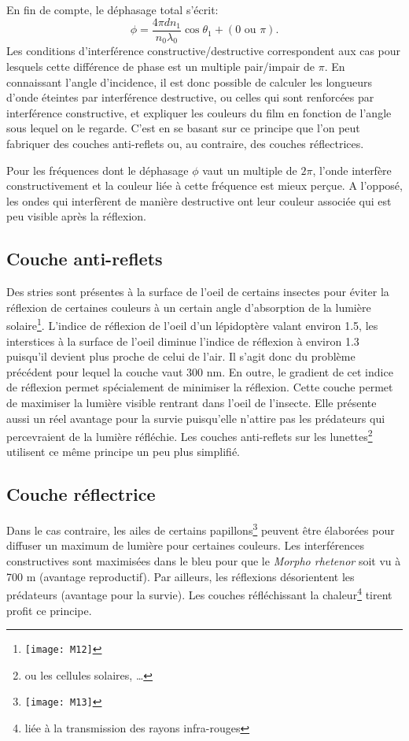 En fin de compte, le déphasage total s'écrit:
$$\phi=\frac{4\pi dn_1}{n_0\lambda_0 }\cos \theta_1+(0\mbox{ ou }\pi).$$
Les conditions d'interférence constructive/destructive correspondent aux cas pour lesquels cette différence de phase est un multiple pair/impair de $\pi$. En connaissant l'angle d'incidence, il est donc possible de calculer les longueurs d'onde éteintes par interférence destructive, ou celles qui sont renforcées par interférence constructive, et expliquer les couleurs du film en fonction de l'angle sous lequel on le regarde. C'est en se basant sur ce principe que l'on peut
fabriquer des couches anti-reflets ou, au contraire, des couches réflectrices.

Pour les fréquences dont le déphasage $\phi$ vaut un multiple de $2\pi$, l'onde interfère constructivement et la couleur liée à cette fréquence est mieux perçue. A l'opposé, les ondes qui interfèrent de manière destructive ont leur couleur associée qui est peu visible après la réflexion.

\subsection{Couche anti-reflets}

Des stries sont présentes à la surface de l'oeil de certains insectes pour éviter la réflexion de certaines couleurs à un certain angle d'absorption de la lumière solaire\footnote{\texttt{[image: M12]}}. L'indice de réflexion de l'oeil d'un lépidoptère valant environ 1.5, les interstices à la surface de l'oeil diminue l'indice de réflexion à environ 1.3 puisqu'il devient plus proche de celui de l'air. Il s'agit donc du problème précédent pour lequel la couche vaut 300 nm. En outre, le gradient de cet indice de réflexion permet spécialement de minimiser la réflexion. Cette couche permet de maximiser la lumière visible rentrant dans l'oeil de l'insecte. Elle présente aussi un réel avantage pour la survie puisqu'elle n'attire pas les prédateurs qui percevraient de la lumière réfléchie. Les couches anti-reflets sur les lunettes\footnote{ou les cellules solaires, \dots} utilisent ce même principe un peu plus simplifié.
\newpage

\subsection{Couche réflectrice}

Dans le cas contraire, les ailes de certains papillons\footnote{\texttt{[image: M13]}} peuvent être élaborées pour diffuser un maximum de lumière pour certaines couleurs. Les interférences constructives sont maximisées dans le bleu pour que le \textit{Morpho rhetenor} soit vu à 700 m (avantage reproductif).	Par ailleurs, les réflexions désorientent les prédateurs (avantage pour la survie). Les couches réfléchissant la chaleur\footnote{liée à la transmission des rayons infra-rouges} tirent profit ce principe.

